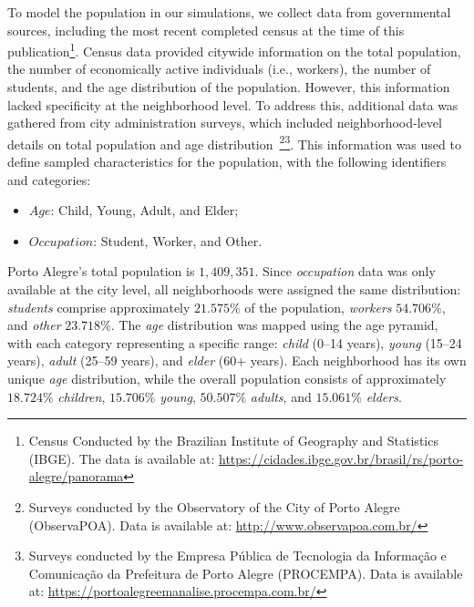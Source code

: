 \documentclass[pdflatex,sn-mathphys-num]{sn-jnl}%
\theoremstyle{thmstyleone}%
\theoremstyle{thmstyletwo}%
\theoremstyle{thmstylethree}%
\begin{document}
To model the population in our simulations, we collect data from governmental sources, including the most recent completed census at the time of this publication\footnote{Census Conducted by the Brazilian Institute of Geography and Statistics (IBGE). The data is available at:  \url{https://cidades.ibge.gov.br/brasil/rs/porto-alegre/panorama}}. Census data provided citywide information on the total population, the number of economically active individuals (i.e., workers), the number of students, and the age distribution of the population. However, this information lacked specificity at the neighborhood level.
To address this, additional data was gathered from city administration surveys, which included neighborhood-level details on total population and age distribution~\footnote{Surveys conducted by the Observatory of the City of Porto Alegre (ObservaPOA). Data is available at: \url{http://www.observapoa.com.br/}}\footnote{Surveys conducted by the Empresa Pública de Tecnologia da Informação e Comunicação da Prefeitura de Porto Alegre (PROCEMPA). Data is available at: \url{https://portoalegreemanalise.procempa.com.br/}}.
This information was used to define sampled characteristics for the population, with the following identifiers and categories:
\begin{itemize}
    \item $Age$: Child, Young, Adult, and Elder;
    \item $Occupation$: Student, Worker, and Other.
\end{itemize}

Porto Alegre's total population is $1,409,351$. Since \textit{occupation} data was only available at the city level, all neighborhoods were assigned the same distribution: \textit{students} comprise approximately $21.575\%$ of the population, \textit{workers} $54.706\%$, and \textit{other} $23.718\%$.
The \textit{age} distribution was mapped using the age pyramid, with each category representing a specific range: \textit{child} (0–14 years), \textit{young} (15–24 years), \textit{adult} (25–59 years), and \textit{elder} (60+ years). Each neighborhood has its own unique \textit{age} distribution, while the overall population consists of approximately $18.724\%$ \textit{children}, $15.706\%$ \textit{young}, $50.507\%$ \textit{adults}, and $15.061\%$ \textit{elders}. 
\end{document}

